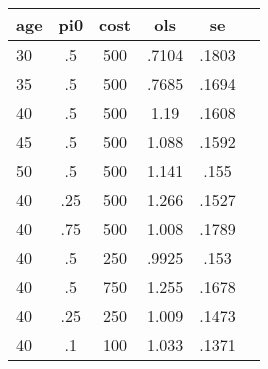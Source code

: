 \begin{table}[htbp]
\begin{tabular}{lccccc} \hline \hline
 \multicolumn{1}{c}{ age }  & pi0  & cost  & ols  & se  \\  \hline 
       30 &        .5 &       500 &     .7104 &     .1803 \\  
       35 &        .5 &       500 &     .7685 &     .1694 \\  
       40 &        .5 &       500 &      1.19 &     .1608 \\  
       45 &        .5 &       500 &     1.088 &     .1592 \\  
       50 &        .5 &       500 &     1.141 &      .155 \\  
       40 &       .25 &       500 &     1.266 &     .1527 \\  
       40 &       .75 &       500 &     1.008 &     .1789 \\  
       40 &        .5 &       250 &     .9925 &      .153 \\  
       40 &        .5 &       750 &     1.255 &     .1678 \\  
       40 &       .25 &       250 &     1.009 &     .1473 \\  
       40 &        .1 &       100 &     1.033 &     .1371 \\  
\hline \hline \end{tabular}
\end{table}
